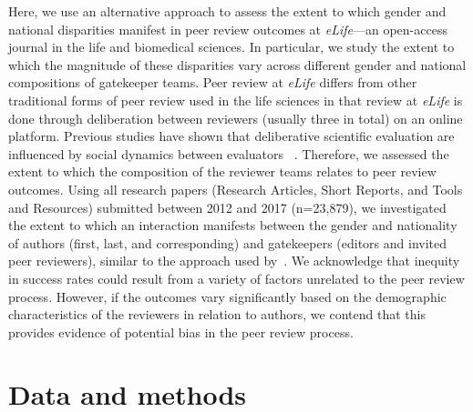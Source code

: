 \documentclass[10pt,letterpaper]{article}
\begin{document}
Here, we use an alternative approach to assess the extent to which gender and national disparities manifest in peer review outcomes at \textit{eLife}—an open-access journal in the life and biomedical sciences. In particular, we study the extent to which the magnitude of these disparities vary across different gender and national compositions of gatekeeper teams. Peer review at \textit{eLife} differs from other traditional forms of peer review used in the life sciences in that review at \textit{eLife} is done through deliberation between reviewers (usually three in total) on an online platform. Previous studies have shown that deliberative scientific evaluation are influenced by social dynamics between evaluators ~\cite{langfeldt_decision-making_2001,lamont_how_2009}. Therefore, we assessed the extent to which the composition of the reviewer teams relates to peer review outcomes. Using all research papers (Research Articles, Short Reports, and Tools and Resources) submitted between 2012 and 2017 (n=23,879), we investigated the extent to which an interaction manifests between the gender and nationality of authors (first, last, and corresponding) and gatekeepers (editors and invited peer reviewers), similar to the approach used by~\cite{walker_personal_2015}. We acknowledge that inequity in success rates could result from a variety of factors unrelated to the peer review process. However, if the outcomes vary significantly based on the demographic characteristics of the reviewers in relation to authors, we contend that this provides evidence of potential bias in the peer review process. 

%
%
\section*{Data and methods}
\end{document}
